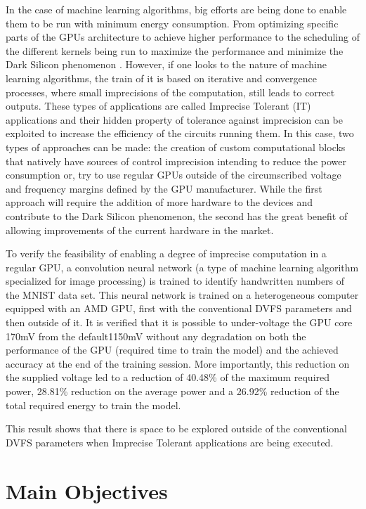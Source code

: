 In the case of machine learning algorithms, big efforts are being done to enable them to be run with minimum energy consumption. From optimizing specific parts of the GPUs architecture to achieve higher performance to the scheduling of the different kernels being run to maximize the performance and minimize the Dark Silicon phenomenon \cite{esmaeilzadeh_dark_2011}. However, if one looks to the nature of machine learning algorithms, the train of it is based on iterative and convergence processes, where small imprecisions of the computation, still leads to correct outputs. These types of applications are called Imprecise Tolerant (IT) applications and their hidden property of tolerance against imprecision can be exploited to increase the efficiency of the circuits running them. In this case, two types of approaches can be made: the creation of custom computational blocks that natively have sources of control imprecision intending to reduce the power consumption \cite{mahdiani_efficient_2017} or, try to use regular GPUs outside of the circumscribed voltage and frequency margins defined by the GPU manufacturer. While the first approach will require the addition of more hardware to the devices and contribute to the Dark Silicon phenomenon, the second has the great benefit of allowing improvements of the current hardware in the market. 

To verify the feasibility of enabling a degree of imprecise computation in a regular GPU, a convolution neural network (a type of machine learning algorithm specialized for image processing) is trained to identify handwritten numbers of the MNIST data set. This neural network is trained on a heterogeneous computer equipped with an AMD GPU, first with the conventional DVFS parameters and then outside of it. It is verified that it is possible to under-voltage the GPU core 170mV from the default1150mV without any degradation on both the performance of the GPU (required time to train the model) and the achieved accuracy at the end of the training session. More importantly, this reduction on the supplied voltage led to a reduction of 40.48\% of the maximum required power,  28.81\% reduction on the average power and a 26.92\% reduction of the total required energy to train the model.

This result shows that there is space to be explored outside of the conventional DVFS parameters when Imprecise Tolerant applications are being executed.


\section{Main Objectives}
\label{section:objectives}

